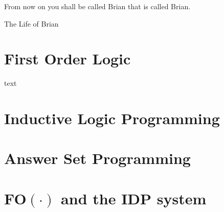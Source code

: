 \epigraph{ From now on you shall be called Brian that is called Brian.}{The Life of Brian}
\section{First Order Logic}
text

\section{Inductive Logic Programming}

\section{Answer Set Programming}

\section{FO$(\cdot)$ and the IDP system}
